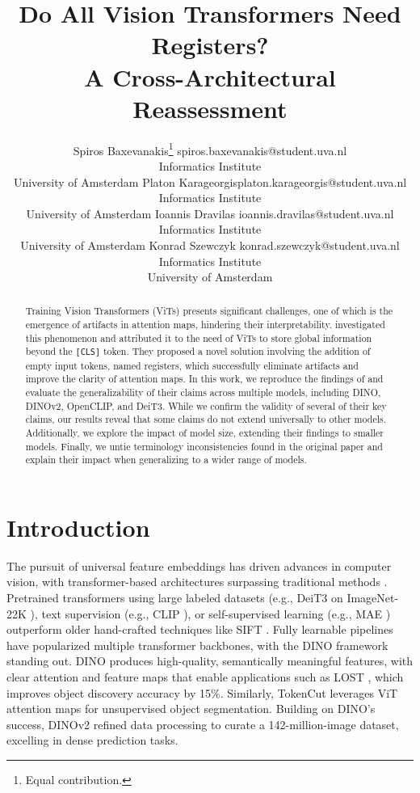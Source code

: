 \documentclass[10pt]{article} %
\title{\centering Do All Vision Transformers Need Registers?\\A Cross-Architectural Reassessment}
\author{\name Spiros Baxevanakis\thanks{Equal contribution.} \email spiros.baxevanakis@student.uva.nl \\
      \addr Informatics Institute\\
      University of Amsterdam
      \AND
      \name Platon Karageorgis\footnotemark[1] \email platon.karageorgis@student.uva.nl \\
      \addr Informatics Institute\\
      University of Amsterdam
      \AND
      \name Ioannis Dravilas \email ioannis.dravilas@student.uva.nl \\
      \addr Informatics Institute\\
      University of Amsterdam
      \AND
      \name Konrad Szewczyk \email konrad.szewczyk@student.uva.nl \\
      \addr Informatics Institute\\
      University of Amsterdam}
\begin{document}
\maketitle

\begin{abstract}
Training Vision Transformers (ViTs) presents significant challenges, one of which is the emergence of artifacts in attention maps, hindering their interpretability. \citet{darcet2024registers} investigated this phenomenon and attributed it to the need of ViTs to store global information beyond the \texttt{[CLS]} token. They proposed a novel solution involving the addition of empty input tokens, named registers, which successfully eliminate artifacts and improve the clarity of attention maps. In this work, we reproduce the findings of \citet{darcet2024registers} and evaluate the generalizability of their claims across multiple models, including DINO, DINOv2, OpenCLIP, and DeiT3. While we confirm the validity of several of their key claims, our results reveal that some claims do not extend universally to other models. Additionally, we explore the impact of model size, extending their findings to smaller models. Finally, we untie terminology inconsistencies found in the original paper and explain their impact when generalizing to a wider range of models.
\end{abstract}

\section{Introduction}
The pursuit of universal feature embeddings has driven advances in computer vision, with transformer-based architectures surpassing traditional methods \citep{vaswani2023attentionneed}. Pretrained transformers using large labeled datasets (e.g., DeiT3 on ImageNet-22K \citep{touvron2022deit}), text supervision (e.g., CLIP \citep{radford2021clip}), or self-supervised learning (e.g., MAE \citep{he2021mae}) outperform older hand-crafted techniques like SIFT \citep{lowe2004distinctive}. Fully learnable pipelines have popularized multiple transformer backbones, with the DINO framework \citep{Caron2021dino} standing out. DINO produces high-quality, semantically meaningful features, with clear attention and feature maps that enable applications such as LOST \citep{simeoni2021lost}, which improves object discovery accuracy by 15\%. Similarly, TokenCut \citep{wang2022selfsupervisedtransformersunsupervisedobject} leverages ViT attention maps for unsupervised object segmentation. Building on DINO’s success, DINOv2 \citep{oquab2023dinov2} refined data processing to curate a 142-million-image dataset, excelling in dense prediction tasks.
\end{document}
